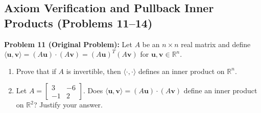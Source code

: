 \documentclass[11pt, letterpaper]{article}
\theoremstyle{definition}
\theoremstyle{remark}
\begin{document}
\subsection{Axiom Verification and Pullback Inner Products (Problems 11--14)}

\textbf{Problem 11 (Original Problem):} Let $A$ be an $n \times n$ real matrix and define $\langle \mathbf{u}, \mathbf{v} \rangle = (A\mathbf{u}) \cdot (A\mathbf{v}) = (A\mathbf{u})^T(A\mathbf{v})$ for $\mathbf{u}, \mathbf{v} \in \mathbb{R}^n$.
\begin{enumerate}[label=(\alph*)]
    \item Prove that if $A$ is invertible, then $\langle \cdot, \cdot \rangle$ defines an inner product on $\mathbb{R}^n$.
    \item Let $A = \begin{bmatrix} 3 & -6 \\ -1 & 2 \end{bmatrix}$. Does $\langle \mathbf{u}, \mathbf{v} \rangle = (A\mathbf{u}) \cdot (A\mathbf{v})$ define an inner product on $\mathbb{R}^2$? Justify your answer.
\end{enumerate}
\end{document}
